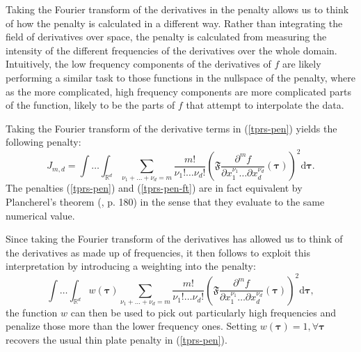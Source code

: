 Taking the Fourier transform of the derivatives in the penalty allows us to think of how the penalty is calculated in a different way. Rather than integrating the field of derivatives over space, the penalty is calculated from measuring the intensity of the different frequencies of the derivatives over the whole domain. Intuitively, the low frequency components of the derivatives of $f$ are likely performing a similar task to those functions in the nullspace of the penalty, where as the more complicated, high frequency components are more complicated parts of the function, likely to be the parts of $f$ that attempt to interpolate the data.

Taking the Fourier transform of the derivative terms in (\ref{tprs-pen}) yields the following penalty:
\begin{equation}
J_{m,d} = \int \ldots \int_{\mathbb{R}^d} \sum_{\nu_1 + \dots + \nu_d=m} \frac{m!}{\nu_1! \dots \nu_d!} \left ( \mathfrak{F} \frac{\partial^m f}{\partial x_1^{\nu_1} \ldots  \partial x_d^{\nu_d}} \left (  \boldsymbol{\tau}\right ) \right )^2 \text{d} \boldsymbol{\tau}.
\label{tprs-pen-ft}
\end{equation}
The penalties (\ref{tprs-pen}) and (\ref{tprs-pen-ft}) are in fact equivalent by Plancherel's theorem (\cite{vretblad}, p. 180) in the sense that they evaluate to the same numerical value.

Since taking the Fourier transform of the derivatives has allowed us to think of the derivatives as made up of frequencies, it then follows to exploit this interpretation by introducing a weighting into the penalty: 
\begin{equation}
\int \ldots \int_{\mathbb{R}^d} w(\boldsymbol{\tau}) \sum_{\nu_1 + \dots + \nu_d=m} \frac{m!}{\nu_1! \dots \nu_d!} \left ( \mathfrak{F} \frac{\partial^m f}{\partial x_1^{\nu_1} \ldots  \partial x_d^{\nu_d}} \left (\boldsymbol{\tau} \right ) \right )^2 \text{d} \boldsymbol{\tau},
\label{duchon-penalty-general}
\end{equation}
the function $w$ can then be used to pick out particularly high frequencies and penalize those more than the lower frequency ones. Setting $w(\boldsymbol{\tau})=1, \forall \boldsymbol{\tau}$ recovers the usual thin plate penalty in (\ref{tprs-pen}).

